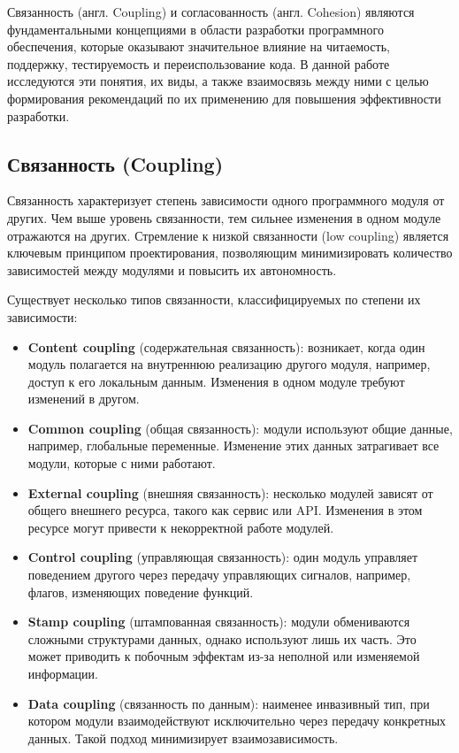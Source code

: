 Связанность (англ. Coupling) и согласованность (англ. Cohesion) являются фундаментальными концепциями в области разработки программного обеспечения, которые оказывают значительное влияние на читаемость, поддержку, тестируемость и переиспользование кода. В данной работе исследуются эти понятия, их виды, а также взаимосвязь между ними с целью формирования рекомендаций по их применению для повышения эффективности разработки.

\subsection*{Связанность (Coupling)}

Связанность характеризует степень зависимости одного программного модуля от других. Чем выше уровень связанности, тем сильнее изменения в одном модуле отражаются на других. Стремление к низкой связанности (low coupling) является ключевым принципом проектирования, позволяющим минимизировать количество зависимостей между модулями и повысить их автономность.

Существует несколько типов связанности, классифицируемых по степени их зависимости:

\begin{itemize}
    \item \textbf{Content coupling} (содержательная связанность): возникает, когда один модуль полагается на внутреннюю реализацию другого модуля, например, доступ к его локальным данным. Изменения в одном модуле требуют изменений в другом.
    \item \textbf{Common coupling} (общая связанность): модули используют общие данные, например, глобальные переменные. Изменение этих данных затрагивает все модули, которые с ними работают.
    \item \textbf{External coupling} (внешняя связанность): несколько модулей зависят от общего внешнего ресурса, такого как сервис или API. Изменения в этом ресурсе могут привести к некорректной работе модулей.
    \item \textbf{Control coupling} (управляющая связанность): один модуль управляет поведением другого через передачу управляющих сигналов, например, флагов, изменяющих поведение функций.
    \item \textbf{Stamp coupling} (штампованная связанность): модули обмениваются сложными структурами данных, однако используют лишь их часть. Это может приводить к побочным эффектам из-за неполной или изменяемой информации.
    \item \textbf{Data coupling} (связанность по данным): наименее инвазивный тип, при котором модули взаимодействуют исключительно через передачу конкретных данных. Такой подход минимизирует взаимозависимость.
\end{itemize}

